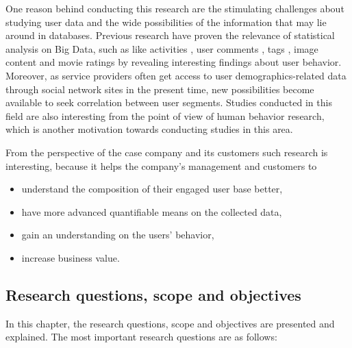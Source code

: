     One reason behind conducting this research are the stimulating challenges about studying user data and the wide possibilities of the information that may lie around in databases. Previous research have proven the relevance of statistical analysis on Big Data, such as like activities \cite{jang2015noreciprocity, jang2016teensengagemorewithfewerphotos, ottoni2013ladies, guy2016whatsyourorganizationlike, jang2015no, youyou2015computer}, user comments \cite{jang2016teensengagemorewithfewerphotos}, tags \cite{jang2016teensengagemorewithfewerphotos}, image content \cite{hu2014we, bakhshi2014faces} and movie ratings \cite{saraee2004data, kabinsingha2012movie} by revealing interesting findings about user behavior. Moreover, as service providers often get access to user demographics-related data through social network sites in the present time, new possibilities become available to seek correlation between user segments. Studies conducted in this field are also interesting from the point of view of human behavior research, which is another motivation towards conducting studies in this area. 

    \pagebreak

    From the perspective of the case company and its customers such research is interesting, because it helps the company's management and customers to 

    \begin{itemize}
        \item understand the composition of their engaged user base better,
        \item have more advanced quantifiable means on the collected data,
        \item gain an understanding on the users' behavior, 
        \item increase business value.
    \end{itemize} 

\subsection{Research questions, scope and objectives}
In this chapter, the research questions, scope and objectives are presented and explained. The most important research questions are as follows:

